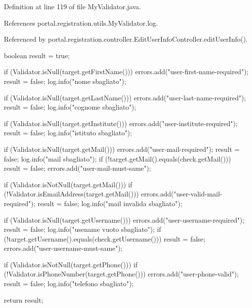 Definition at line 119 of file MyValidator.java.



References portal.registration.utils.MyValidator.log.



Referenced by portal.registration.controller.EditUserInfoController.editUserInfo().


\begin{DoxyCode}
                                                                    {
                boolean result = true;

                if (Validator.isNull(target.getFirstName())) {
                        errors.add("user-first-name-required");
                        result = false;
                        log.info("nome sbagliato");
                }

                if (Validator.isNull(target.getLastName())) {
                        errors.add("user-last-name-required");
                        result = false;
                        log.info("cognome sbagliato");
                }

                if (Validator.isNull(target.getInstitute())) {
                        errors.add("user-institute-required");
                        result = false;
                        log.info("istituto sbagliato");
                }

                if (Validator.isNull(target.getMail())) {
                        errors.add("user-mail-required");
                        result = false;
                        log.info("mail sbagliato");
                }
                if (!target.getMail().equals(check.getMail())) {
                        result = false;
                        errors.add("user-mail-must-same");
                }

                if (Validator.isNotNull(target.getMail())) {
                        if (!Validator.isEmailAddress(target.getMail())) {
                                errors.add("user-valid-mail-required");
                                result = false;
                                log.info("mail invalida sbagliato");
                        }
                }

                if (Validator.isNull(target.getUsername())) {
                        errors.add("user-username-required");
                        result = false;
                        log.info("usename vuoto sbagliato");
                }
                if (!target.getUsername().equals(check.getUsername())) {
                        result = false;
                        errors.add("user-username-must-same");
                }

                if (Validator.isNotNull(target.getPhone())) {
                        if (!Validator.isPhoneNumber(target.getPhone())) {
                                errors.add("user-phone-valid");
                                result = false;
                                log.info("telefono sbagliato");
                        }
                }

                return result;
        }
\end{DoxyCode}


